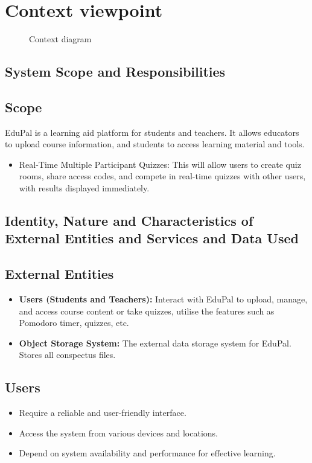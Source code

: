 \section{Context viewpoint}

\begin{figure}[H]
    \caption{Context diagram}
    \label{context-view-context-diagram}
\end{figure}


\subsection{System Scope and Responsibilities}

\subsection*{Scope}
EduPal is a learning aid platform for students and teachers. It allows educators to upload course information, and students to access learning material and tools.

\begin{itemize}
    \item Real-Time Multiple Participant Quizzes: This will allow users to create quiz rooms, share access codes, and compete in real-time quizzes with other users, with results displayed immediately.
\end{itemize}


\subsection{Identity, Nature and Characteristics of External Entities and Services and Data Used}

\subsection*{External Entities}
\begin{itemize}
    \item \textbf{Users (Students and Teachers):} Interact with EduPal to upload, manage, and access course content or take quizzes, utilise the features such as Pomodoro timer, quizzes, etc.
    \item \textbf{Object Storage System:} The external data storage system for EduPal. Stores all conspectus files.
\end{itemize}

\subsection*{Users}
\begin{itemize}
    \item Require a reliable and user-friendly interface.
    \item Access the system from various devices and locations.
    \item Depend on system availability and performance for effective learning.
\end{itemize}


